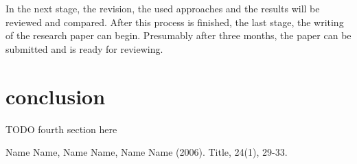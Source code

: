 \documentclass[journal]{IEEEtran}
\begin{document}
In the next stage, the revision, the used approaches and the results will be reviewed and compared. 
After this process is finished, the last stage, the writing of the research paper can begin. 
Presumably after three months, the paper can be submitted and is ready for reviewing. 

\section{conclusion} 
TODO fourth section here

\begin{thebibliography}{1}

\bibitem{}
Name Name, Name Name, Name Name (2006). Title, 24(1), 29-33.

\end{thebibliography}
\end{document}

